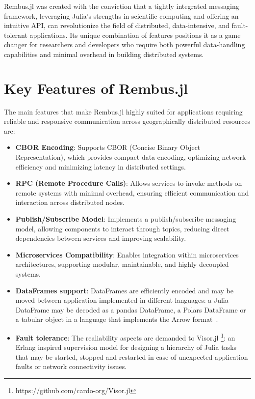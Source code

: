 \documentclass{juliacon}
\begin{document}
 Rembus.jl was created with the conviction that a tightly integrated messaging
 framework, leveraging Julia’s strengths in scientific computing and offering an
 intuitive API, can revolutionize the field of distributed, data-intensive, and
 fault-tolerant applications. Its unique combination of features positions it as
 a game changer for researchers and developers who require both powerful
 data-handling capabilities and minimal overhead in building distributed systems.

\section{Key Features of Rembus.jl}\label{key-features-of-rembus.jl}

The main features that make Rembus.jl highly suited for applications requiring
reliable and responsive communication across geographically distributed
resources are:

\begin{itemize}
\item
  \textbf{CBOR Encoding}: Supports CBOR \cite{CBOR} (Concise Binary
  Object Representation), which provides compact data encoding,
  optimizing network efficiency and minimizing latency in distributed
  settings.
\item
  \textbf{RPC (Remote Procedure Calls)}: Allows services to invoke
  methods on remote systems with minimal overhead, ensuring efficient
  communication and interaction across distributed nodes.
\item
  \textbf{Publish/Subscribe Model}: Implements a publish/subscribe
  messaging model, allowing components to interact through topics,
  reducing direct dependencies between services and improving
  scalability.
\item
  \textbf{Microservices Compatibility}: Enables integration within
  microservices architectures, supporting modular, maintainable, and
  highly decoupled systems.
\item
  \textbf{DataFrames support}: DataFrames are efficiently encoded and
  may be moved between application implemented in different languages: a
  Julia DataFrame may be decoded as a pandas DataFrame, a Polars
  DataFrame or a tabular object in a language that implements the Arrow
  format~\cite{Arrow}.
\item
  \textbf{Fault tolerance}: The realiability aspects are demanded to
  Visor.jl \footnote{https://github.com/cardo-org/Visor.jl}: an Erlang
  inspired supervision model \cite{Erlang} for designing a hierarchy of
  Julia tasks that may be started, stopped and restarted in case of
  unexpected application faults or network connectivity issues.
\end{itemize}
\end{document}
